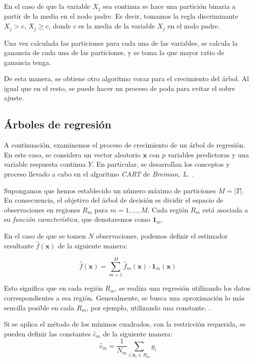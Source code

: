 \noindent En el caso de que la variable $X_j$ sea continua se hace una partición binaria a partir de la media en el nodo padre. Es decir, tomamos la regla discriminante $X_j>c$, $X_j\geq c$, donde $c$ es la media de la variable $X_j$ en el nodo padre. 

\noindent Una vez calculada las particiones para cada una de las variables, se calcula la ganancia de cada una de las particiones, y se toma la que mayor ratio de ganancia tenga. 

\noindent De esta manera, se obtiene otro algoritmo voraz para el crecimiento del árbol. Al igual que en el resto, se puede hacer un proceso de poda para evitar el sobre ajuste. 

\subsection{Árboles de regresión }
\noindent A continuación, examinemos el  proceso de crecimiento de un árbol de regresión. En este caso, se considera un vector aleatorio $\mathbf{x}$ con $p$ variables predictoras y una variable respuesta continua $Y$. En particular, se desarrollan los conceptos y proceso llevado a cabo en el algoritmo \emph{CART} de \emph{Breiman, L.} \cite{Breiman 1984}. 

\noindent Supongamos que hemos establecido un número máximo de particiones $M=|T|$. En consecuencia, el objetivo del árbol de decisión es dividir el espacio de observaciones en regiones $R_m$ para $m=1,\ldots, M$. Cada región $R_m$ está asociada a su \emph{función característica}, que denotaremos como $\mathbf{1}_m$.

\noindent En el caso de que se tomen $N$ observaciones, podemos definir el estimador resultante $\hat{f}(\mathbf{x})$ de la siguiente manera:

\begin{equation}
\hat{f}(\mathbf{x})=\sum_{m=1}^M \hat{f}_m(\mathbf{x})\cdot \mathbf{1}_m(\mathbf{x})
\end{equation}

\noindent Esto significa que en cada región $R_m$, se realiza una regresión utilizando los datos correspondientes a esa región. Generalmente, se busca una aproximación lo más sencilla posible en cada $R_m$, por ejemplo, utilizando una constante. \cite{Hastie 2001,Biau 2016}.

\noindent Si se aplica el método de los mínimos cuadrados, con la restricción requerida, se pueden definir las constantes $\hat{c}_m$ de la siguiente manera:
\begin{equation}
\hat{c}_m=\dfrac{1}{N_m}\sum_{i/\mathbf{x}_i\in R_m} y_i
\end{equation}

